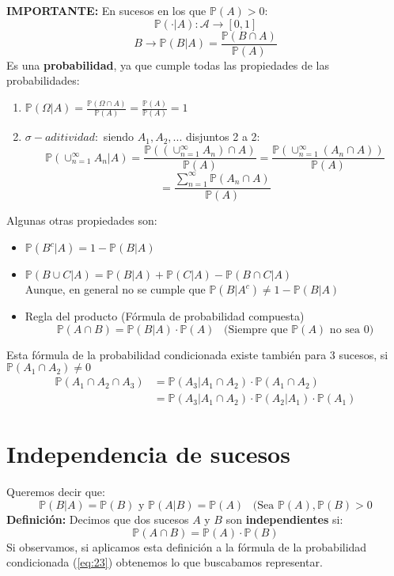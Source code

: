 \documentclass[11pt]{article}
\newcommand{\prob}{\mathbb{P}}
\newcommand{\OMG}{\varOmega}
\theoremstyle{plain}
\begin{document}
        \textbf{IMPORTANTE:} En sucesos en los que $\prob(A)>0$:
        \[\prob(\cdot | A) : \mathcal{A} \rightarrow [0,1]\]
        \[B \rightarrow \prob(B | A) = \frac{\prob(B \cap A)}{\prob(A)}\]
        Es una \textbf{probabilidad}, ya que cumple todas las propiedades de las probabilidades:
        \begin{enumerate}
            \item $\prob(\OMG | A) = \frac{\prob(\OMG \cap A)}{\prob(A)} = \frac{\prob(A)}{\prob(A)} = 1$
            \item $\sigma-aditividad:$ siendo $A_1,A_2,...$ disjuntos 2 a 2: \[\prob(\cup_{n=1}^{\infty} A_n | A) = \frac{\prob((\cup_{n=1}^{\infty} A_n) \cap A)}{\prob(A)} = \frac{\prob(\cup_{n=1}^{\infty} (A_n\cap A))}{\prob(A)}\]
            \[= \frac{ \sum_{ n=1 }^{ \infty } \prob(A_n \cap A)}{\prob(A)} \]
        \end{enumerate}
        Algunas otras propiedades son:
        \begin{itemize}
            \item $\prob (B ^c | A) = 1 - \prob (B|A)$
            \item $\prob (B \cup C | A) = \prob(B | A) + \prob(C|A) - \prob(B\cap C | A)$\\ Aunque, en general no se cumple que $\prob (B | A^c) \ne 1 - \prob (B|A)$
            \item Regla del producto (Fórmula de probabilidad compuesta) \[\prob (A\cap B) = \prob (B | A) \cdot \prob (A) \;\;\;\text{(Siempre que $\prob(A)$ no sea 0)}\]
        \end{itemize}
        Esta fórmula de la probabilidad condicionada existe también para 3 sucesos, si $\prob(A_1\cap A_2) \ne 0$
        \begin{equation}
            \begin{aligned}
                \prob (A_1 \cap A_2 \cap A_3) & = \prob (A_3 | A_1 \cap A_2) \cdot \prob (A_1 \cap A_2)\\
                & = \prob (A_3 | A_1 \cap A_2) \cdot \prob (A_2 | A_1) \cdot \prob (A_1)
            \end{aligned}
        \end{equation}
    \section{Independencia de sucesos} %
    \label{sec:independencia_de_sucesos}
        Queremos decir que:
        \[\prob (B|A) = \prob (B) \text{ y } \prob (A|B) = \prob (A) \;\;\;\text{(Sea $\prob(A), \prob(B) > 0$}\]
        \textbf{Definición:} Decimos que dos sucesos $A$ y $B$ son \textbf{independientes} si: \[\prob(A \cap B) = \prob (A) \cdot \prob (B)\]
        Si observamos, si aplicamos esta definición a la fórmula de la probabilidad condicionada (\ref{eq:23}) obtenemos lo que buscabamos representar.
\end{document}
